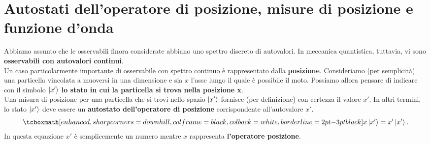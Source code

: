 \documentclass[a4paper,12pt,oneside]{book}
\newcommand*{\myfont}{\fontfamily{ppl}\selectfont}
\begin{document}
\fancypagestyle{plain}{%
\fancyhf{} %
\fancyfoot[C]{\bfseries \myfont{\thepage}} %
\renewcommand{\headrulewidth}{0pt}
\renewcommand{\footrulewidth}{0pt}}

\fancypagestyle{VS}{
\headheight = 15pt
\lhead[\myfont{\textit{\textbf{\thechapter\nouppercase{\leftmark}}}}]{\myfont{\textit{\textbf{\nouppercase{\leftmark}}}}}
\chead[]{}
\rhead[\myfont{\textbf{\thepage}}]{\myfont{\textbf{\thepage}}}

\lfoot[]{}
\cfoot[]{}
\rfoot[]{}
}



\pagestyle{VS}
\setcounter{chapter}{4}
\setcounter{page}{64}
\chapter[Autostati dell'operatore di posizione]{Autostati dell'operatore di posizione, misure di posizione e funzione d'onda}
Abbiamo assunto che le osservabili finora considerate abbiano uno spettro discreto di autovalori. In meccanica quantistica, tuttavia, vi sono \textbf{osservabili con autovalori continui}.\\

Un caso particolarmente importante di osservabile con spettro continuo è rappresentato dalla \textbf{posizione}.
Consideriamo (per semplicità) una particella vincolata a muoversi in una dimensione e sia $x$ l'asse lungo il quale è possibile il moto. Possiamo allora pensare di indicare con il simbolo $\ket{x'}$ \textbf{lo stato in cui la particella si trova nella posizione x}.\\

Una misura di posizione per una particella che si trovi nello spazio $\ket{x'}$ fornisce (per definizione) con certezza il valore $x'$. In altri termini, lo stato $\ket{x'}$ deve essere un \textbf{autostato dell'operatore di posizione} corrispondente all'autovalore $x'$.
	\begin{equation}
 		\tcboxmath[enhanced, sharp corners=downhill, colframe=black, colback=white, borderline={2pt}{-3pt}{black}]{
 			x\ket{x'} = x'\ket{x'} .
 			}
	\end{equation}
In questa equazione $x'$ è semplicemente un numero mentre $x$ rappresenta \textbf{l'operatore posizione}.\\
\end{document}
